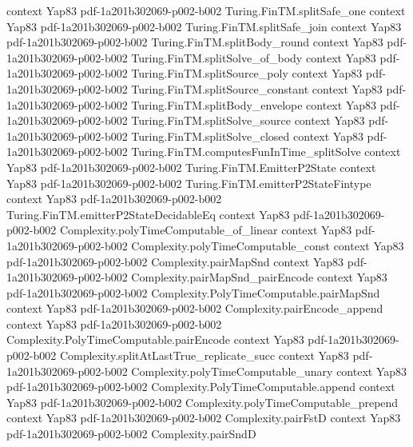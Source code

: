 \begin{theorem}
  {context}
  {Yap83}
  {pdf-1a201b302069-p002-b002}
\proofstep
  {Turing.FinTM.splitSafe_one}
  {context}
  {Yap83}
  {pdf-1a201b302069-p002-b002}
\proofstep
  {Turing.FinTM.splitSafe_join}
  {context}
  {Yap83}
  {pdf-1a201b302069-p002-b002}
\proofstep
  {Turing.FinTM.splitBody_round}
  {context}
  {Yap83}
  {pdf-1a201b302069-p002-b002}
\proofstep
  {Turing.FinTM.splitSolve_of_body}
  {context}
  {Yap83}
  {pdf-1a201b302069-p002-b002}
\proofstep
  {Turing.FinTM.splitSource_poly}
  {context}
  {Yap83}
  {pdf-1a201b302069-p002-b002}
\proofstep
  {Turing.FinTM.splitSource_constant}
  {context}
  {Yap83}
  {pdf-1a201b302069-p002-b002}
\proofstep
  {Turing.FinTM.splitBody_envelope}
  {context}
  {Yap83}
  {pdf-1a201b302069-p002-b002}
\proofstep
  {Turing.FinTM.splitSolve_source}
  {context}
  {Yap83}
  {pdf-1a201b302069-p002-b002}
\proofstep
  {Turing.FinTM.splitSolve_closed}
  {context}
  {Yap83}
  {pdf-1a201b302069-p002-b002}
\proofstep
  {Turing.FinTM.computesFunInTime_splitSolve}
  {context}
  {Yap83}
  {pdf-1a201b302069-p002-b002}
\proofstep
  {Turing.FinTM.EmitterP2State}
  {context}
  {Yap83}
  {pdf-1a201b302069-p002-b002}
\proofstep
  {Turing.FinTM.emitterP2StateFintype}
  {context}
  {Yap83}
  {pdf-1a201b302069-p002-b002}
\proofstep
  {Turing.FinTM.emitterP2StateDecidableEq}
  {context}
  {Yap83}
  {pdf-1a201b302069-p002-b002}
\proofstep
  {Complexity.polyTimeComputable_of_linear}
  {context}
  {Yap83}
  {pdf-1a201b302069-p002-b002}
\proofstep
  {Complexity.polyTimeComputable_const}
  {context}
  {Yap83}
  {pdf-1a201b302069-p002-b002}
\proofstep
  {Complexity.pairMapSnd}
  {context}
  {Yap83}
  {pdf-1a201b302069-p002-b002}
\proofstep
  {Complexity.pairMapSnd_pairEncode}
  {context}
  {Yap83}
  {pdf-1a201b302069-p002-b002}
\proofstep
  {Complexity.PolyTimeComputable.pairMapSnd}
  {context}
  {Yap83}
  {pdf-1a201b302069-p002-b002}
\proofstep
  {Complexity.pairEncode_append}
  {context}
  {Yap83}
  {pdf-1a201b302069-p002-b002}
\proofstep
  {Complexity.PolyTimeComputable.pairEncode}
  {context}
  {Yap83}
  {pdf-1a201b302069-p002-b002}
\proofstep
  {Complexity.splitAtLastTrue_replicate_succ}
  {context}
  {Yap83}
  {pdf-1a201b302069-p002-b002}
\proofstep
  {Complexity.polyTimeComputable_unary}
  {context}
  {Yap83}
  {pdf-1a201b302069-p002-b002}
\proofstep
  {Complexity.PolyTimeComputable.append}
  {context}
  {Yap83}
  {pdf-1a201b302069-p002-b002}
\proofstep
  {Complexity.polyTimeComputable_prepend}
  {context}
  {Yap83}
  {pdf-1a201b302069-p002-b002}
\proofstep
  {Complexity.pairFstD}
  {context}
  {Yap83}
  {pdf-1a201b302069-p002-b002}
\proofstep
  {Complexity.pairSndD}

\end{theorem}
